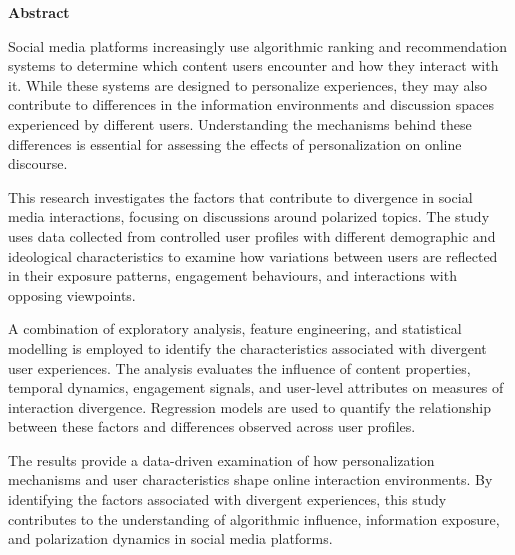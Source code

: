 \documentclass[12pt,a4paper]{article}
\theoremstyle{style}
\begin{document}


\thispagestyle{empty}


\clearpage

\begin{center}
    {\Large\bfseries Abstract}
\end{center}

\vspace{1cm}

\begin{singlespace}

Social media platforms increasingly use algorithmic ranking and recommendation systems to determine which content users encounter and how they interact with it. While these systems are designed to personalize experiences, they may also contribute to differences in the information environments and discussion spaces experienced by different users. Understanding the mechanisms behind these differences is essential for assessing the effects of personalization on online discourse.

This research investigates the factors that contribute to divergence in social media interactions, focusing on discussions around polarized topics. The study uses data collected from controlled user profiles with different demographic and ideological characteristics to examine how variations between users are reflected in their exposure patterns, engagement behaviours, and interactions with opposing viewpoints.

A combination of exploratory analysis, feature engineering, and statistical modelling is employed to identify the characteristics associated with divergent user experiences. The analysis evaluates the influence of content properties, temporal dynamics, engagement signals, and user-level attributes on measures of interaction divergence. Regression models are used to quantify the relationship between these factors and differences observed across user profiles.

The results provide a data-driven examination of how personalization mechanisms and user characteristics shape online interaction environments. By identifying the factors associated with divergent experiences, this study contributes to the understanding of algorithmic influence, information exposure, and polarization dynamics in social media platforms.

\end{singlespace}


\clearpage
\end{document}
